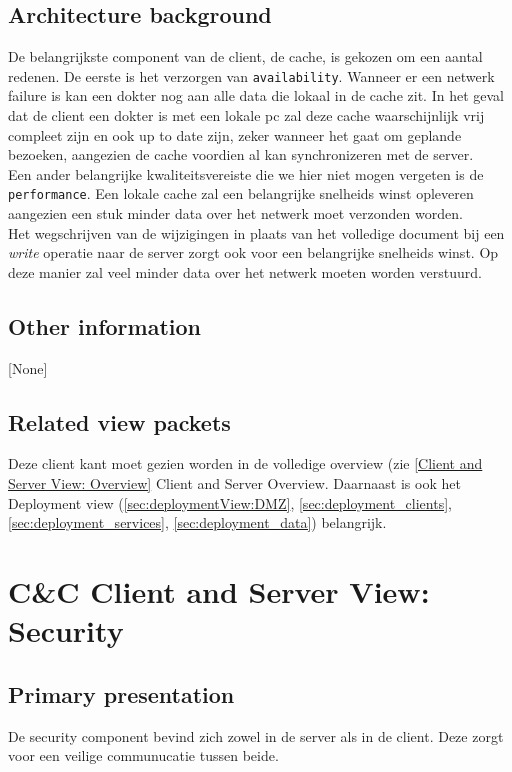 \documentclass[a4paper,10pt]{article}
\begin{document}
\subsection{Architecture background}
De belangrijkste component van de client, de cache, is gekozen om een aantal redenen.  De eerste is het verzorgen van \texttt{availability}.  Wanneer er een netwerk failure is kan een dokter nog aan alle data die lokaal in de cache zit.  In het geval dat de client een dokter is met een lokale pc zal deze cache waarschijnlijk vrij compleet zijn en ook up to date zijn, zeker wanneer het gaat om geplande bezoeken, aangezien de cache voordien al kan synchronizeren met de server.\\
Een ander belangrijke kwaliteitsvereiste die we hier niet mogen vergeten is de \texttt{performance}.  Een lokale cache zal een belangrijke snelheids winst opleveren aangezien een stuk minder data over het netwerk moet verzonden worden.\\
Het wegschrijven van de wijzigingen in plaats van het volledige document bij een \textit{write} operatie naar de server zorgt ook voor een belangrijke snelheids winst.  Op deze manier zal veel minder data over het netwerk moeten worden verstuurd.

\subsection{Other information}
[None]

\subsection{Related view packets}
Deze client kant moet gezien worden in de volledige overview (zie \ref{Client and Server View: Overview} Client and Server Overview.  Daarnaast is ook het Deployment view (\ref{sec:deploymentView:DMZ}, \ref{sec:deployment_clients}, \ref{sec:deployment_services}, \ref{sec:deployment_data}) belangrijk.


\clearpage
\section{C\&C Client and Server View: Security}
\label{Client and Server View: Security}

\subsection{Primary presentation}
De security component bevind zich zowel in de server als in de client. Deze zorgt voor een veilige communucatie tussen beide.
\end{document}

